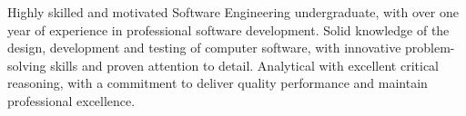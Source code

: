 

\begin{cvparagraph}

Highly skilled and motivated Software Engineering undergraduate, with over one year of experience in professional software development. Solid knowledge of the design, development and testing of computer software, with innovative problem-solving skills and proven attention to detail. Analytical with excellent critical reasoning, with a commitment to deliver quality performance and maintain professional excellence.
\end{cvparagraph}
